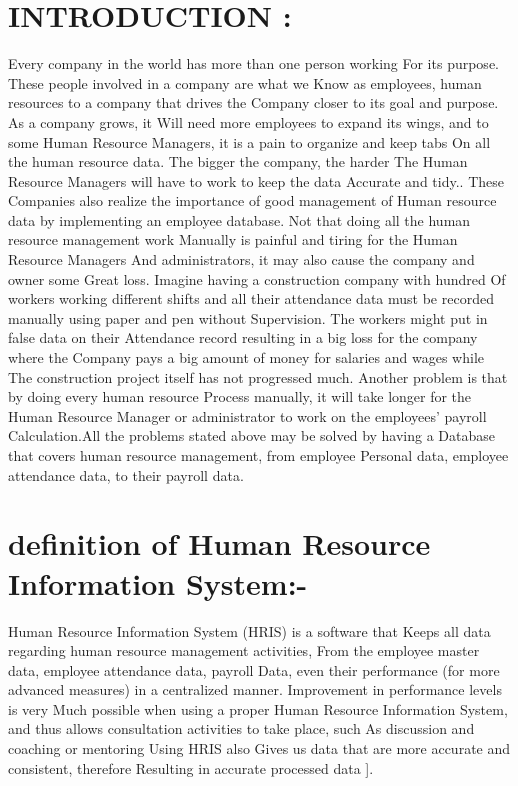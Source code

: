 \documentclass[12pt,a4paper]{article}
\begin{document}
\section*{INTRODUCTION : }Every company in the world has more than one person working For its purpose. These people involved in a company are what we Know as employees, human resources to a company that drives the Company closer to its goal and purpose. As a company grows, it Will need more employees to expand its wings, and to some Human Resource Managers, it is a pain to organize and keep tabs On all the human resource data. The bigger the company, the harder The Human Resource Managers will have to work to keep the data Accurate and tidy.. These Companies also realize the importance of good management of Human resource data by implementing an employee database. Not that doing all the human resource management work Manually is painful and tiring for the Human Resource Managers And administrators, it may also cause the company and owner some Great loss. Imagine having a construction company with hundred Of workers working different shifts and all their attendance data must be recorded manually using paper and pen without Supervision. The workers might put in false data on their Attendance record resulting in a big loss for the company where the Company pays a big amount of money for salaries and wages while The construction project itself has not progressed much. Another problem is that by doing every human resource Process manually, it will take longer for the Human Resource Manager or administrator to work on the employees’ payroll Calculation.All the problems stated above may be solved by having a Database that covers human resource management, from employee Personal data, employee attendance data, to their payroll data.
\section*{definition of Human Resource Information System:-}Human Resource Information System (HRIS) is a software that Keeps all data regarding human resource management activities, From the employee master data, employee attendance data, payroll Data, even their performance (for more advanced measures) in a centralized manner. Improvement in performance levels is very Much possible when using a proper Human Resource Information System, and thus allows consultation activities to take place, such As discussion and coaching or mentoring   Using HRIS also Gives us data that are more accurate and consistent, therefore Resulting in accurate processed data ].
\end{document}
